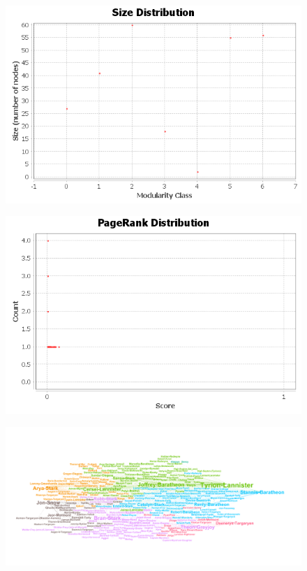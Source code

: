 \documentclass[]{article}
\begin{document}
\begin{figure}[htbp]  
\centering
\includegraphics{modb2/communities-size-distribution.png}
\end{figure}

\begin{figure}[htbp]  
\centering
\includegraphics{prb2/pageranks.png}
\end{figure}

\begin{figure}[htbp]  
\centering
\includegraphics{b2.png}
\end{figure}\newpage
\end{document}
